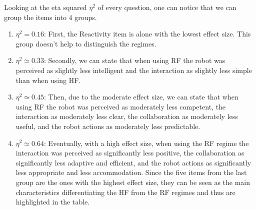 Looking at the eta squared $\eta^2$ of every question, one can notice that we can group the items into 4 groups. 
\begin{enumerate}
    \item $\eta^2=0.16$: First, the Reactivity item is alone with the lowest effect size. This group doesn't help to distinguish the regimes. 
    \item $\eta^2 \simeq 0.33$: Secondly, we can state that when using RF the robot was perceived as slightly less intelligent and the interaction as slightly less simple than when using HF. 
    \item $\eta^2 \simeq 0.45$: Then, due to the moderate effect size, we can state that when using RF the robot was perceived as moderately less competent, the interaction as moderately less clear, the collaboration as moderately less useful, and the robot actions as moderately less predictable. 
    \item $\eta^2 \simeq 0.64$: Eventually, with a high effect size, when using the RF regime the interaction was perceived as significantly less positive, the collaboration as significantly less adaptive and efficient, and the robot actions as significantly less appropriate and less accommodation. Since the five items from the last group are the ones with the highest effect size, they can be seen as the main characteristics differentiating the HF from the RF regimes and thus are highlighted in the table.
\end{enumerate}

